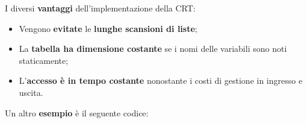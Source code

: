 \documentclass[a4paper]{article}
\begin{document}
	\noindent
	I diversi \textcolor{Green4}{\textbf{vantaggi}} dell'implementazione della CRT:
	\begin{itemize}
		\item Vengono \textbf{evitate} le \textbf{lunghe scansioni di liste};
		
		\item La \textbf{tabella ha dimensione costante} se i nomi delle variabili sono noti staticamente;
		
		\item L'\textbf{accesso è in tempo costante} nonostante i costi di gestione in ingresso e uscita.
	\end{itemize}
	Un altro \textcolor{Green4}{\textbf{esempio}} è il seguente codice:
	
\end{document}
